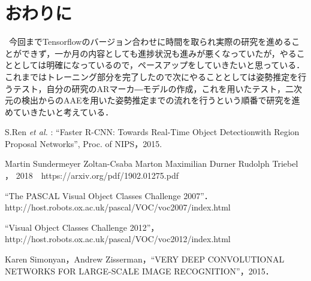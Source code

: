 \documentclass[11pt,a4j,ascmac]{jarticle}
\begin{document}
\section{おわりに}
\ 今回までTensorflowのバージョン合わせに時間を取られ実際の研究を進めることができず，一か月の内容としても進捗状況も進みが悪くなっていたが，やることとしては明確になっているので，ペースアップをしていきたいと思っている．これまではトレーニング部分を完了したので次にやることとしては姿勢推定を行うテスト，自分の研究のARマーカ―モデルの作成，これを用いたテスト，二次元の検出からのAAEを用いた姿勢推定までの流れを行うという順番で研究を進めていきたいと考えている．
\footnotesize
\begin{thebibliography}{99}



S.Ren {\em et al. }: ``Faster R-CNN: Towards Real-Time Object Detectionwith Region Proposal Networks'', Proc. of NIPS，2015.


Martin Sundermeyer Zoltan-Csaba Marton Maximilian Durner Rudolph Triebel ， 2018　https://arxiv.org/pdf/1902.01275.pdf


``The PASCAL Visual Object Classes Challenge 2007''．http://host.robots.ox.ac.uk/pascal/VOC/voc2007/index.html

``Visual Object Classes Challenge 2012''，http://host.robots.ox.ac.uk/pascal/VOC/voc2012/index.html


Karen Simonyan，Andrew Zisserman，``VERY DEEP CONVOLUTIONAL NETWORKS FOR LARGE-SCALE IMAGE RECOGNITION''，2015．


\end{thebibliography}

\normalsize
\end{document}
